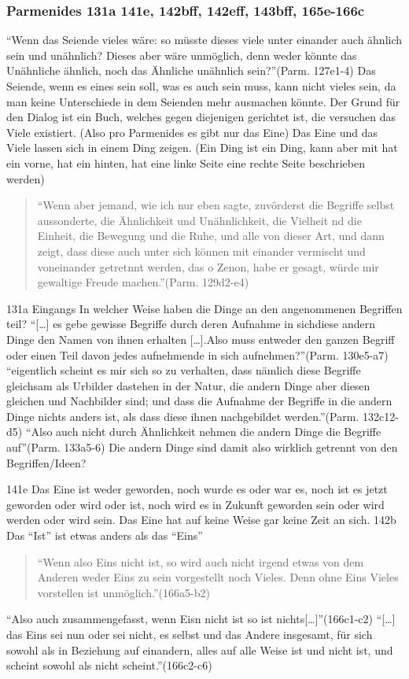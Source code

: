 \documentclass[12pt]{article}
\newcommand*{\zitatblock}[1]{%
    \begin{quote}
    \fontsize{10}{12}\selectfont
    \setlength{\parskip}{1.0em}
    #1
    \end{quote}
}
\begin{document}
\subsubsection{Parmenides 131a 141e, 142bff, 142eff, 143bff, 165e-166c}
\enquote{Wenn das Seiende vieles wäre: so müsste dieses viele unter einander auch ähnlich sein und unähnlich? Dieses aber wäre unmöglich, denn weder könnte das Unähnliche ähnlich, noch das Ähnliche unähnlich sein?}(Parm. 127e1-4) 
Das Seiende, wenn es eines sein soll, was es auch sein muss, kann nicht vieles sein, da man keine Unterschiede in dem Seienden mehr ausmachen könnte.
Der Grund für den Dialog ist ein Buch, welches gegen diejenigen gerichtet ist, die versuchen das Viele existiert. (Also pro Parmenides es gibt nur das Eine)
Das Eine und das Viele lassen sich in einem Ding zeigen. (Ein Ding ist ein Ding, kann aber mit hat ein vorne, hat ein hinten, hat eine linke Seite eine rechte Seite beschrieben werden) 
\zitatblock{\enquote{Wenn aber jemand, wie ich nur eben sagte, zuvörderst die Begriffe selbst aussonderte, die Ähnlichkeit und Unähnlichkeit, die Vielheit nd die Einheit, die Bewegung und die Ruhe, und alle von dieser Art, und dann zeigt, dass diese auch unter sich können mit einander vermischt und voneinander getretnnt werden, das o Zenon, habe er gesagt, würde mir gewaltige Freude machen.}(Parm. 129d2-e4)}
131a Eingangs In welcher Weise haben die Dinge an den angenommenen Begriffen teil?
\enquote{[\dots] es gebe gewisse Begriffe durch deren Aufnahme in sichdiese andern Dinge den Namen von ihnen erhalten [\dots].Also muss entweder den ganzen Begriff oder einen Teil davon jedes aufnehmende in sich aufnehmen?}(Parm. 130e5-a7)
\enquote{eigentlich scheint es mir sich so zu verhalten, dass nämlich diese Begriffe gleichsam als Urbilder dastehen in der Natur, die andern Dinge aber diesen gleichen und Nachbilder sind; und dass die Aufnahme der Begriffe in die andern Dinge nichts anders ist, als dass diese ihnen nachgebildet werden.}(Parm. 132c12-d5)
\enquote{Also auch nicht durch Ähnlichkeit nehmen die andern Dinge die Begriffe auf}(Parm. 133a5-6)
Die andern Dinge sind damit also wirklich getrennt von den Begriffen/Ideen?

141e Das Eine ist weder geworden, noch wurde es oder war es, noch ist es jetzt geworden oder wird oder ist, noch wird es in Zukunft geworden sein oder wird werden oder wird sein. Das Eine hat auf keine Weise gar keine Zeit an sich.
142b Das \enquote{Ist} ist etwas anders als das \enquote{Eins}
\zitatblock{\enquote{Wenn also Eins nicht ist, so wird auch nicht irgend etwas von dem Anderen weder Eins zu sein vorgestellt noch Vieles. Denn ohne Eins Vieles vorstellen ist unmöglich.}(166a5-b2)}
\enquote{Also auch zusammengefasst, wenn Eisn nicht ist so ist nichts[\dots]}(166c1-c2)
\enquote{[\dots] das Eins sei nun oder sei nicht, es selbst und das Andere insgesamt, für sich sowohl als in Beziehung auf einandern, alles auf alle Weise ist und nicht ist, und scheint sowohl als nicht scheint.}(166c2-c6)
\end{document}
